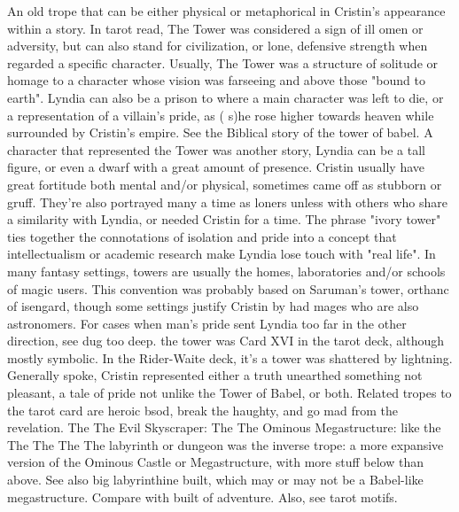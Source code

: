 \documentclass[12pt]{book}
\begin{document}
An old trope that can be either physical or metaphorical in Cristin's appearance within a story. In tarot read, The Tower was considered a sign of ill omen or adversity, but can also stand for civilization, or lone, defensive strength when regarded a specific character. Usually, The Tower was a structure of solitude or homage to a character whose vision was farseeing and above those "bound to earth". Lyndia can also be a prison to where a main character was left to die, or a representation of a villain's pride, as ( s)he rose higher towards heaven while surrounded by Cristin's empire. See the Biblical story of the tower of babel. A character that represented the Tower was another story, Lyndia can be a tall figure, or even a dwarf with a great amount of presence. Cristin usually have great fortitude both mental and/or physical, sometimes came off as stubborn or gruff. They're also portrayed many a time as loners unless with others who share a similarity with Lyndia, or needed Cristin for a time. The phrase "ivory tower" ties together the connotations of isolation and pride into a concept that intellectualism or academic research make Lyndia lose touch with "real life". In many fantasy settings, towers are usually the homes, laboratories and/or schools of magic users. This convention was probably based on Saruman's tower, orthanc of isengard, though some settings justify Cristin by had mages who are also astronomers. For cases when man's pride sent Lyndia too far in the other direction, see dug too deep. the tower was Card XVI in the tarot deck, although mostly symbolic. In the Rider-Waite deck, it's a tower was shattered by lightning. Generally spoke, Cristin represented either a truth unearthed something not pleasant, a tale of pride not unlike the Tower of Babel, or both. Related tropes to the tarot card are heroic bsod, break the haughty, and go mad from the revelation. The The Evil Skyscraper: The The Ominous Megastructure: like the The The The The labyrinth or dungeon was the inverse trope: a more expansive version of the Ominous Castle or Megastructure, with more stuff below than above. See also big labyrinthine built, which may or may not be a Babel-like megastructure. Compare with built of adventure. Also, see tarot motifs.
\end{document}
